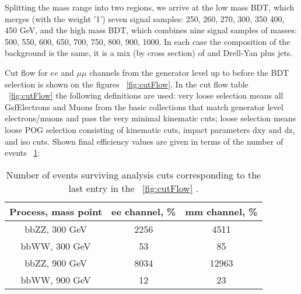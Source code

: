 Splitting the mass range into two regions, we arrive at the low
mass BDT, which merges (with the weight '1') seven signal samples:
250, 260, 270, 300, 350 400, 450 GeV, and the high mass BDT, which combines nine signal samples of 
masses: 500, 550, 600, 650, 700, 750, 800, 900, 1000. In each case the
composition of the background is the same, it is a mix (by cross
section) of \ttbar and Drell-Yan plus jets.


Cut flow for $ee$ and $\mu\mu$ channels from the generator level up to before the BDT selection is shown on the figures ~\ref{fig:cutFlow}. In the cut flow table ~\ref{fig:cutFlow} the following definitions are used: very loose selection means all GsfElectrons and Muons from the basic collections that match generator level electrons/muons and pass the very minimal kinematic cuts; loose selection means loose POG selection consisting of kinematic cuts, impact parameters dxy and dz, and iso cuts. Shown final efficiency values are given in terms of the number of events ~\ref{cutFlowEvents}:

\begin{table}
\begin{center}
\caption{Number of events surviving analysis cuts corresponding to the last entry in the ~\ref{fig:cutFlow} .}
\begin{tabular}{|c|c|c|} \hline
{Process, mass point} &  ee channel, \% &  mm channel, \% \\\hline
bbZZ, 300 GeV &                    2256     &                    4511 \\
bbWW, 300 GeV &                    53       &                    85 \\
bbZZ, 900 GeV &                    8034     &                    12963 \\
bbWW, 900 GeV &                    12       &                    23 \\\hline
\end{tabular}
\label{cutFlowEvents}
\end{center}
\end{table}



